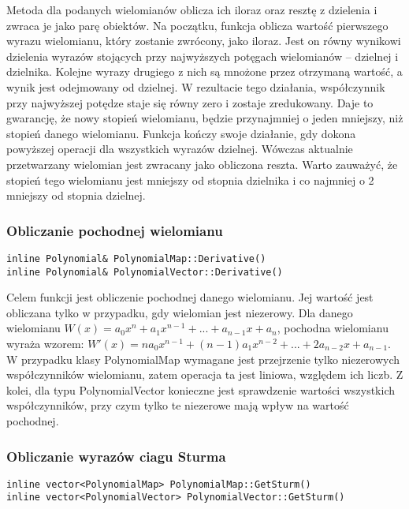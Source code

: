 \documentclass[twoside,a4paper]{book}
\begin{document}
Metoda dla podanych wielomianów oblicza ich iloraz oraz resztę z dzielenia i zwraca je jako parę obiektów. Na początku, funkcja oblicza wartość pierwszego wyrazu wielomianu, który zostanie zwrócony, jako iloraz. Jest on równy wynikowi dzielenia wyrazów stojących przy najwyższych potęgach wielomianów – dzielnej i dzielnika. Kolejne wyrazy drugiego z nich są mnożone przez otrzymaną wartość, a wynik jest odejmowany od dzielnej. W rezultacie tego działania, współczynnik przy najwyższej potędze staje się równy zero i zostaje zredukowany. Daje to gwarancję, że nowy stopień wielomianu, będzie przynajmniej o jeden mniejszy, niż stopień danego wielomianu. Funkcja kończy swoje działanie, gdy dokona powyższej operacji dla wszystkich wyrazów dzielnej. Wówczas aktualnie przetwarzany wielomian jest zwracany jako obliczona reszta. Warto zauważyć, że stopień tego wielomianu jest mniejszy od stopnia dzielnika i co najmniej o 2 mniejszy od stopnia dzielnej.
\\

\subsubsection{Obliczanie pochodnej wielomianu}
\begin{lstlisting}
inline Polynomial& PolynomialMap::Derivative()
inline Polynomial& PolynomialVector::Derivative()
\end{lstlisting}

Celem funkcji jest obliczenie pochodnej danego wielomianu. Jej wartość jest obliczana tylko w przypadku, gdy wielomian jest niezerowy. Dla danego wielomianu $W(x) = a_0x^n + a_1x^{n-1} + ... + a_{n-1}x + a_n$, pochodna wielomianu wyraża wzorem: $W'(x) = na_0x^{n-1} + (n-1)a_1x^{n-2} + ... + 2a_{n-2}x + a_{n-1}$. W przypadku klasy PolynomialMap wymagane jest przejrzenie tylko niezerowych współczynników wielomianu, zatem operacja ta jest liniowa, względem ich liczb. Z kolei, dla typu PolynomialVector konieczne jest sprawdzenie wartości wszystkich współczynników, przy czym tylko te niezerowe mają wpływ na wartość pochodnej.

\subsubsection{Obliczanie wyrazów ciagu Sturma}
\begin{lstlisting}
inline vector<PolynomialMap> PolynomialMap::GetSturm()
inline vector<PolynomialVector> PolynomialVector::GetSturm()
\end{lstlisting}
\end{document}
